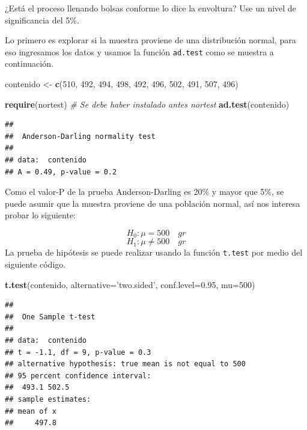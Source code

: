 \documentclass[10pt,]{krantz}
\makeatletter
\newenvironment{Shaded}{\begin{snugshade}}{\end{snugshade}}
\newcommand{\KeywordTok}[1]{\textcolor[rgb]{0.13,0.29,0.53}{\textbf{{#1}}}}
\newcommand{\DataTypeTok}[1]{\textcolor[rgb]{0.13,0.29,0.53}{{#1}}}
\newcommand{\DecValTok}[1]{\textcolor[rgb]{0.00,0.00,0.81}{{#1}}}
\newcommand{\FloatTok}[1]{\textcolor[rgb]{0.00,0.00,0.81}{{#1}}}
\newcommand{\StringTok}[1]{\textcolor[rgb]{0.31,0.60,0.02}{{#1}}}
\newcommand{\CommentTok}[1]{\textcolor[rgb]{0.56,0.35,0.01}{\textit{{#1}}}}
\newcommand{\NormalTok}[1]{{#1}}
\newenvironment{kframe}{%
\medskip{}
\setlength{\fboxsep}{.8em}
 \def\at@end@of@kframe{}%
 \ifinner\ifhmode%
  \def\at@end@of@kframe{\end{minipage}}%
  \begin{minipage}{\columnwidth}%
 \fi\fi%
 \def\FrameCommand##1{\hskip\@totalleftmargin \hskip-\fboxsep
 \colorbox{shadecolor}{##1}\hskip-\fboxsep
     \hskip-\linewidth \hskip-\@totalleftmargin \hskip\columnwidth}%
 \MakeFramed {\advance\hsize-\width
   \@totalleftmargin\z@ \linewidth\hsize
   \@setminipage}}%
 {\par\unskip\endMakeFramed%
 \at@end@of@kframe}
\renewenvironment{Shaded}{\begin{kframe}}{\end{kframe}}
\makeatother
\begin{document}
¿Está el proceso llenando bolsas conforme lo dice la envoltura? Use un
nivel de significancia del 5\%.

Lo primero es explorar si la muestra proviene de una distribución
normal, para eso ingresamos los datos y usamos la función
\texttt{ad.test} como se muestra a continuación.

\begin{Shaded}
\begin{Highlighting}[]
\NormalTok{contenido <-}\StringTok{ }\KeywordTok{c}\NormalTok{(}\DecValTok{510}\NormalTok{, }\DecValTok{492}\NormalTok{, }\DecValTok{494}\NormalTok{, }\DecValTok{498}\NormalTok{, }\DecValTok{492}\NormalTok{,}
               \DecValTok{496}\NormalTok{, }\DecValTok{502}\NormalTok{, }\DecValTok{491}\NormalTok{, }\DecValTok{507}\NormalTok{, }\DecValTok{496}\NormalTok{) }

\KeywordTok{require}\NormalTok{(nortest) }\CommentTok{# Se debe haber instalado antes nortest}
\KeywordTok{ad.test}\NormalTok{(contenido)}
\end{Highlighting}
\end{Shaded}

\begin{verbatim}
## 
##  Anderson-Darling normality test
## 
## data:  contenido
## A = 0.49, p-value = 0.2
\end{verbatim}

Como el valor-P de la prueba Anderson-Darling es 20\% y mayor que 5\%,
se puede asumir que la muestra proviene de una población normal, así nos
interesa probar lo siguiente:

\[H_0: \mu = 500 \quad gr\] \[H_1: \mu \neq 500 \quad gr\] La prueba de
hipótesis se puede realizar usando la función \texttt{t.test} por medio
del siguiente código.

\begin{Shaded}
\begin{Highlighting}[]
\KeywordTok{t.test}\NormalTok{(contenido, }\DataTypeTok{alternative=}\StringTok{'two.sided'}\NormalTok{,}
       \DataTypeTok{conf.level=}\FloatTok{0.95}\NormalTok{, }\DataTypeTok{mu=}\DecValTok{500}\NormalTok{)}
\end{Highlighting}
\end{Shaded}

\begin{verbatim}
## 
##  One Sample t-test
## 
## data:  contenido
## t = -1.1, df = 9, p-value = 0.3
## alternative hypothesis: true mean is not equal to 500
## 95 percent confidence interval:
##  493.1 502.5
## sample estimates:
## mean of x 
##     497.8
\end{verbatim}
\end{document}
